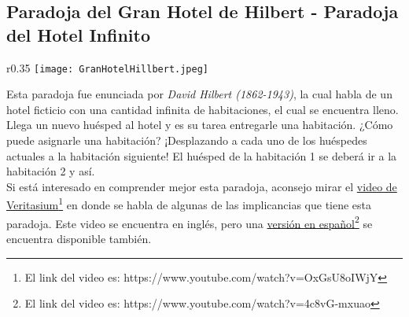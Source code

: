 \documentclass[../main.tex]{subfiles}
\begin{document}
\subsection{Paradoja del Gran Hotel de Hilbert - Paradoja del Hotel Infinito}
\begin{wrapfigure}{r}{0.35\textwidth}
    \centering
    \texttt{[image: GranHotelHillbert.jpeg]}
\end{wrapfigure}
Esta paradoja fue enunciada por \textit{David Hilbert (1862-1943)}, la cual habla de un hotel ficticio con una cantidad infinita de habitaciones, el cual se encuentra lleno. Llega un nuevo huésped al hotel y es su tarea entregarle una habitación. ¿Cómo puede asignarle una habitación? ¡Desplazando a cada uno de los huéspedes actuales a la habitación siguiente! El huésped de la habitación 1 se deberá ir a la habitación 2 y así.\\
Si está interesado en comprender mejor esta paradoja, aconsejo mirar el \href{https://www.youtube.com/watch?v=OxGsU8oIWjY}{video de Veritasium}\footnote{El link del video es: https://www.youtube.com/watch?v=OxGsU8oIWjY} en donde se habla de algunas de las implicancias que tiene esta paradoja. Este video se encuentra en inglés, pero una \href{https://www.youtube.com/watch?v=4c8vG-mxuao}{versión en español}\footnote{El link del video es: https://www.youtube.com/watch?v=4c8vG-mxuao} se encuentra disponible también.
\end{document}
